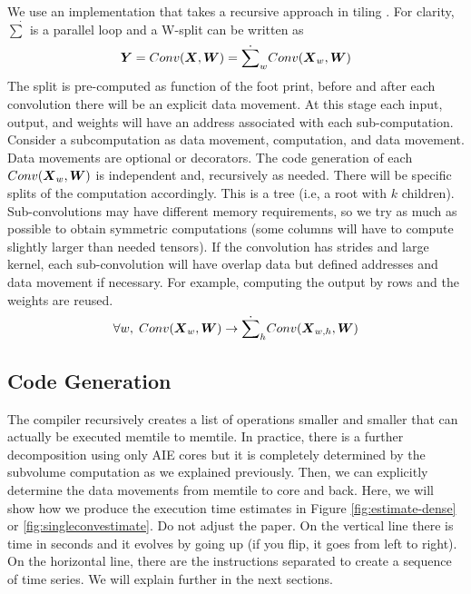 \documentclass[conference]{IEEEtran}
\begin{document}
We use an implementation that takes a recursive approach in tiling
\cite{abs-2110-04327}. For clarity, $\dot{\sum}$ is a parallel loop
and a W-split can be written as
\begin{equation}
  {\boldsymbol Y} =  Conv({\boldsymbol X},{\boldsymbol W}) = \dot{\sum}_w
  Conv({\boldsymbol X}_w,{\boldsymbol W})
\end{equation}
The split is pre-computed as function of the foot print, before and
after each convolution there will be an explicit data movement. At
this stage each input, output, and weights will have an address
associated with each sub-computation. Consider a subcomputation as
data movement, computation, and data movement. Data movements are
optional or decorators.  The code generation of each
$Conv({\boldsymbol X}_w,{\boldsymbol W})$ is independent and, recursively as needed.
There will be specific splits of the computation accordingly. This is
a tree (i.e, a root with $k$ children). Sub-convolutions may have
different memory requirements, so we try as much as possible to obtain
symmetric computations (some columns will have to compute slightly
larger than needed tensors). If the convolution has strides and large
kernel, each sub-convolution will have overlap data but defined
addresses and data movement if necessary. For example, computing the
output by rows and the weights are reused.
\begin{equation}
  \forall w, \;   Conv({\boldsymbol X}_w,{\boldsymbol W}) \rightarrow  \dot{\sum}_h Conv({\boldsymbol X}_{w,h},{\boldsymbol W})
\end{equation}





\subsection{Code Generation }
The compiler recursively creates a list of operations smaller and
smaller that can actually be executed memtile to memtile. In practice,
there is a further decomposition using only AIE cores but it is
completely determined by the subvolume computation as we explained
previously. Then, we can explicitly determine the data movements from
memtile to core and back. Here, we will show how we produce the
execution time estimates in Figure \ref{fig:estimate-dense} or
\ref{fig:singleconvestimate}.  Do not adjust the paper. On the
vertical line there is time in seconds and it evolves by going up (if
you flip, it goes from left to right). On the horizontal line, there
are the instructions separated to create a sequence of time series. We
will explain further in the next sections.
\end{document}
